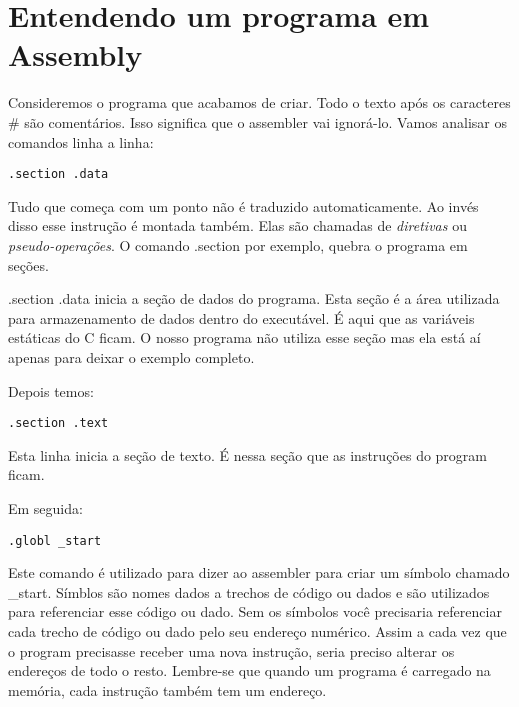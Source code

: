 \section{Entendendo um programa em Assembly}

Consideremos o programa que acabamos de criar. Todo o texto após os caracteres \# são comentários. Isso significa que o assembler vai ignorá-lo. Vamos analisar os comandos linha a linha:

\begin{espacosimples}
\begin{verbatim}
.section .data
\end{verbatim}
\end{espacosimples}

Tudo que começa com um ponto não é traduzido automaticamente. Ao invés disso esse instrução é montada também. Elas são chamadas de \emph{diretivas} ou \emph{pseudo-operações}. O comando .section por exemplo, quebra o programa em seções.

.section .data inicia a seção de dados do programa. Esta seção é a área utilizada para armazenamento de dados dentro do executável. É aqui que as variáveis estáticas do C ficam. O nosso programa não utiliza esse seção mas ela está aí apenas para deixar o exemplo completo.

Depois temos:

\begin{espacosimples}
\begin{verbatim}
.section .text
\end{verbatim}
\end{espacosimples}

Esta linha inicia a seção de texto. É nessa seção que as instruções do program ficam.

Em seguida:

\begin{espacosimples}
\begin{verbatim}
.globl _start
\end{verbatim}
\end{espacosimples}

Este comando é utilizado para dizer ao assembler para criar um símbolo chamado \_{}start. Símblos são nomes dados a trechos de código ou dados e são utilizados para referenciar esse código ou dado. Sem os símbolos você precisaria referenciar cada trecho de código ou dado pelo seu endereço numérico. Assim a cada vez que o program precisasse receber uma nova instrução, seria preciso alterar os endereços de todo o resto. Lembre-se que quando um programa é carregado na memória, cada instrução também tem um endereço.

